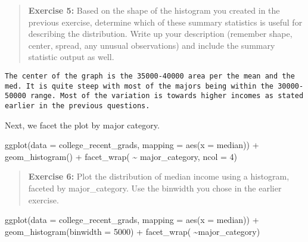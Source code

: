 \documentclass[
]{article}
\newenvironment{Shaded}{\begin{snugshade}}{\end{snugshade}}
\newcommand{\AttributeTok}[1]{\textcolor[rgb]{0.77,0.63,0.00}{#1}}
\newcommand{\DecValTok}[1]{\textcolor[rgb]{0.00,0.00,0.81}{#1}}
\newcommand{\FunctionTok}[1]{\textcolor[rgb]{0.00,0.00,0.00}{#1}}
\newcommand{\NormalTok}[1]{#1}
\newcommand{\SpecialCharTok}[1]{\textcolor[rgb]{0.00,0.00,0.00}{#1}}
\begin{document}
\begin{quote}
\textbf{Exercise 5:} Based on the shape of the histogram you created in
the previous exercise, determine which of these summary statistics is
useful for describing the distribution. Write up your description
(remember shape, center, spread, any unusual observations) and include
the summary statistic output as well.
\end{quote}

\begin{verbatim}
The center of the graph is the 35000-40000 area per the mean and the med. It is quite steep with most of the majors being within the 30000-50000 range. Most of the variation is towards higher incomes as stated earlier in the previous questions.
\end{verbatim}

Next, we facet the plot by major category.

\begin{Shaded}
\begin{Highlighting}[]
\FunctionTok{ggplot}\NormalTok{(}\AttributeTok{data =}\NormalTok{ college\_recent\_grads, }\AttributeTok{mapping =} \FunctionTok{aes}\NormalTok{(}\AttributeTok{x =}\NormalTok{ median)) }\SpecialCharTok{+}
  \FunctionTok{geom\_histogram}\NormalTok{() }\SpecialCharTok{+}
  \FunctionTok{facet\_wrap}\NormalTok{( }\SpecialCharTok{\textasciitilde{}}\NormalTok{ major\_category, }\AttributeTok{ncol =} \DecValTok{4}\NormalTok{)}
\end{Highlighting}
\end{Shaded}

\begin{quote}
\textbf{Exercise 6:} Plot the distribution of median income using a
histogram, faceted by major\_category. Use the binwidth you chose in the
earlier exercise.
\end{quote}

\begin{Shaded}
\begin{Highlighting}[]
\FunctionTok{ggplot}\NormalTok{(}\AttributeTok{data =}\NormalTok{ college\_recent\_grads, }\AttributeTok{mapping =} \FunctionTok{aes}\NormalTok{(}\AttributeTok{x =}\NormalTok{ median)) }\SpecialCharTok{+}
  \FunctionTok{geom\_histogram}\NormalTok{(}\AttributeTok{binwidth =} \DecValTok{5000}\NormalTok{) }\SpecialCharTok{+}
  \FunctionTok{facet\_wrap}\NormalTok{( }\SpecialCharTok{\textasciitilde{}}\NormalTok{major\_category)}
\end{Highlighting}
\end{Shaded}
\end{document}
